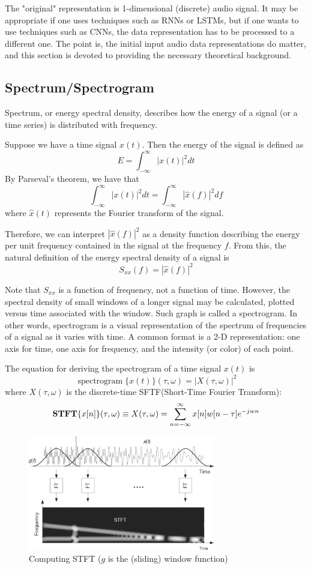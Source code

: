 \documentclass{article}
\DeclareMathOperator{\spectrogram}{spectrogram}
\theoremstyle{plain}
\theoremstyle{definition}
\theoremstyle{remark}
\begin{document}
	The "original" representation is 1-dimensional (discrete) audio signal.
	It may be appropriate if one uses techniques such as RNNs or LSTMs, but if one wants to use techniques such as CNNs, the data representation has to be processed to a different one.
	The point is, the initial input audio data representations do matter, and this section is devoted to providing the necessary theoretical background.
	
	
\subsection{Spectrum/Spectrogram}
	Spectrum, or energy spectral density, describes how the energy of a signal (or a time series) is distributed with frequency.
	
	Suppose we have a time signal $x(t)$. Then the energy of the signal is defined as
	$$E = \int_{-\infty}^\infty |x(t)|^2 dt$$
	By Parseval's theorem, we have that
	$$\int_{-\infty}^\infty |x(t)|^2 dt = \int_{-\infty}^\infty |\hat{x}(f)|^2 df$$
	where $\hat{x}(t)$ represents the Fourier transform of the signal.
	
	Therefore, we can interpret $|\hat{x}(f)|^2$ as a density function describing the energy per unit frequency contained in the signal at the frequency $f$.
	From this, the natural definition of the energy spectral density of a signal is
	$$S_{xx}(f) = |\hat{x}(f)|^2$$
	
	Note that $S_{xx}$ is a function of frequency, not a function of time.
	However, the spectral density of small windows of a longer signal may be calculated, plotted versus time associated with the window. Such graph is called a spectrogram.
	In other words, spectrogram is a visual representation of the spectrum of frequencies of a signal as it varies with time.
	A common format is a 2-D representation: one axis for time, one axis for frequency, and the intensity (or color) of each point.
	
	The equation for deriving the spectrogram of a time signal $x(t)$ is
	$$\spectrogram \{x(t)\} (\tau, \omega) = |X(\tau, \omega)|^2$$
	where $X(\tau, \omega)$ is the discrete-time SFTF(Short-Time Fourier Transform):
	$${\bf STFT}\{x[n]\}(\tau, \omega) \equiv X(\tau, \omega) = \sum_{n = -\infty}^\infty x[n] w[n - \tau] e^{-jwn}$$

\begin{figure}[hbt!]
\includegraphics[height=5cm]{fig1.jpg}
    \centering
    \caption{Computing STFT ($g$ is the (sliding) window function)}
\end{figure}	
\end{document}
